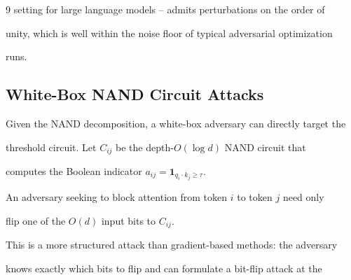\documentclass[11pt]{article}
\theoremstyle{definition}
\begin{document}
\begin{thebibliography}{9}
setting for large language models -- admits perturbations on the order of






unity, which is well within the noise floor of typical adversarial optimization






runs.













\subsection{White-Box NAND Circuit Attacks}













Given the NAND decomposition, a white-box adversary can directly target the






threshold circuit.  Let $C_{ij}$ be the depth-$O(\log d)$ NAND circuit that






computes the Boolean indicator $a_{ij} = \mathbf{1}_{q_i \cdot k_j \geq \tau}$.






An adversary seeking to block attention from token $i$ to token $j$ need only






flip one of the $O(d)$ input bits to $C_{ij}$.













This is a more structured attack than gradient-based methods: the adversary






knows exactly which bits to flip and can formulate a bit-flip attack at the







\end{thebibliography}
\end{document}
